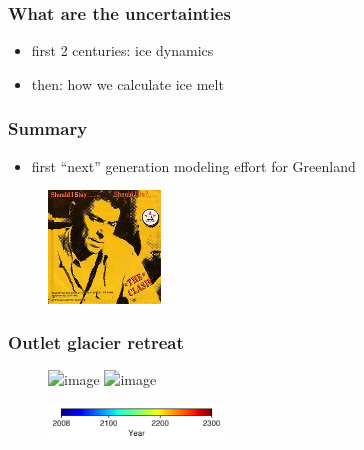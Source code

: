 \documentclass[hide notes,intlimits]{beamer}
\begin{document}
\begin{frame}
  \frametitle{What are the uncertainties}
  \begin{itemize}
  \item first 2 centuries: ice dynamics
  \item then: how we calculate ice melt
  \end{itemize}
\end{frame}


\begin{frame}
  \frametitle{Summary}
  \begin{itemize}
  \item first ``next'' generation modeling effort for Greenland
  \end{itemize}
  \begin{figure}
    \includegraphics[width=3cm]{clash}
  \end{figure}
\end{frame}



\begin{frame}
  \frametitle{Outlet glacier retreat}
  \begin{figure}
    \includegraphics<1>[height=7.25cm]{rcp45_Upernavik_Isstrom_S}
    \includegraphics<2>[height=7.25cm]{rcp45_Store_Gletscher}
  \end{figure}
  \vspace{-0.5cm}
  \begin{figure}
    \includegraphics[height=1cm]{jet_horizontal}
  \end{figure}
\end{frame}
\end{document}
